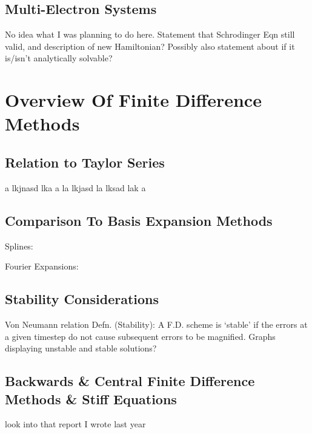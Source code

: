 \subsection{Multi-Electron Systems}
No idea what I was planning to do here.
\newline
Statement that Schrodinger Eqn still valid, and description of new Hamiltonian? Possibly also statement about if it is/isn't analytically solvable?

\section{Overview Of Finite Difference Methods}

\subsection{Relation to Taylor Series}
a lkjnasd lka a la lkjasd la lksad lak a

\subsection{Comparison To Basis Expansion Methods}
Splines:

Fourier Expansions:


\subsection{Stability Considerations}
Von Neumann relation
Defn. (Stability): A F.D. scheme is `stable' if the errors at a given timestep do not cause subsequent errors to be magnified.
Graphs displaying unstable and stable solutions?

\subsection{Backwards \& Central Finite Difference Methods \& Stiff Equations}
look into that report I wrote last year

